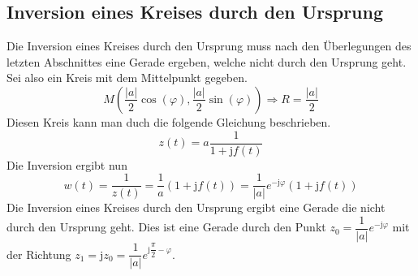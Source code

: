 \subsection{Inversion eines Kreises durch den Ursprung}
Die Inversion eines Kreises durch den Ursprung muss nach den Überlegungen des letzten Abschnittes eine Gerade ergeben, welche nicht durch den Ursprung geht. Sei also ein Kreis mit dem Mittelpunkt gegeben. 
\begin{equation}
\boxed{M\left(\dfrac{\Big\vert a\Big\vert}{2}\cos\left(\varphi\right), \dfrac{\Big\vert a\Big\vert}{2}\sin\left(\varphi\right)\right)\Rightarrow R=\dfrac{\Big\vert a\Big\vert}{2}}
\end{equation}
Diesen Kreis kann man duch die folgende Gleichung beschrieben.
\begin{equation}
\boxed{z\left(t\right)=a\dfrac{1}{1+\text{j}f\left(t\right)}}
\end{equation}
Die Inversion ergibt nun
\begin{equation}
\boxed{w\left(t\right)=\dfrac{1}{z\left(t\right)}=\dfrac{1}{a}\left(1+\text{j}f\left(t\right)\right)=\dfrac{1}{\Big\vert a\Big\vert}e^{-\text{j}\varphi}\left(1+\text{j}f\left(t\right)\right)}
\end{equation}
Die Inversion eines Kreises durch den Ursprung ergibt eine Gerade die nicht durch den Ursprung geht. Dies ist eine Gerade durch den Punkt $z_0=\dfrac{1}{\Big\vert a\Big\vert}e^{-\text{j}\varphi}$ mit der Richtung $z_1=\text{j}z_0=\dfrac{1}{\Big\vert a\Big\vert}e^{\text{j}\dfrac{\pi}{2}-\varphi}$. 
